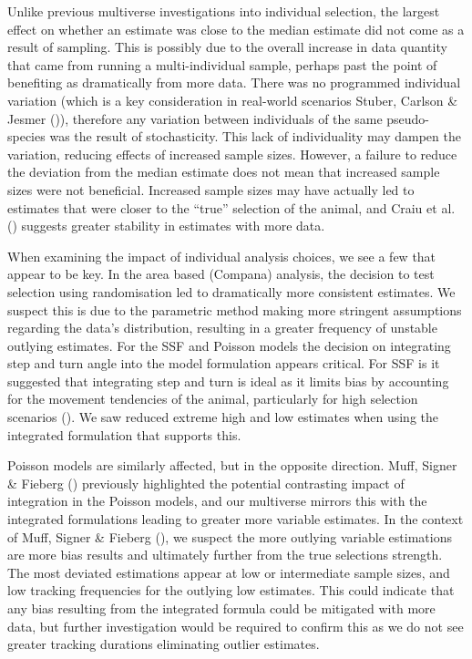 \documentclass[10pt,a4paper]{article}
\begin{document}
Unlike previous multiverse investigations into individual selection, the largest effect on whether an estimate was close to the median estimate did not come as a result of sampling.
This is possibly due to the overall increase in data quantity that came from running a multi-individual sample, perhaps past the point of benefiting as dramatically from more data.
There was no programmed individual variation (which is a key consideration in real-world scenarios Stuber, Carlson \& Jesmer ()), therefore any variation between individuals of the same pseudo-species was the result of stochasticity.
This lack of individuality may dampen the variation, reducing effects of increased sample sizes.
However, a failure to reduce the deviation from the median estimate does not mean that increased sample sizes were not beneficial.
Increased sample sizes may have actually led to estimates that were closer to the ``true'' selection of the animal, and Craiu et al. () suggests greater stability in estimates with more data.

When examining the impact of individual analysis choices, we see a few that appear to be key.
In the area based (Compana) analysis, the decision to test selection using randomisation led to dramatically more consistent estimates.
We suspect this is due to the parametric method making more stringent assumptions regarding the data's distribution, resulting in a greater frequency of unstable outlying estimates.
For the SSF and Poisson models the decision on integrating step and turn angle into the model formulation appears critical.
For SSF is it suggested that integrating step and turn is ideal as it limits bias by accounting for the movement tendencies of the animal, particularly for high selection scenarios ().
We saw reduced extreme high and low estimates when using the integrated formulation that supports this.

Poisson models are similarly affected, but in the opposite direction.
Muff, Signer \& Fieberg () previously highlighted the potential contrasting impact of integration in the Poisson models, and our multiverse mirrors this with the integrated formulations leading to greater more variable estimates.
In the context of Muff, Signer \& Fieberg (), we suspect the more outlying variable estimations are more bias results and ultimately further from the true selections strength.
The most deviated estimations appear at low or intermediate sample sizes, and low tracking frequencies for the outlying low estimates.
This could indicate that any bias resulting from the integrated formula could be mitigated with more data, but further investigation would be required to confirm this as we do not see greater tracking durations eliminating outlier estimates.
\end{document}
